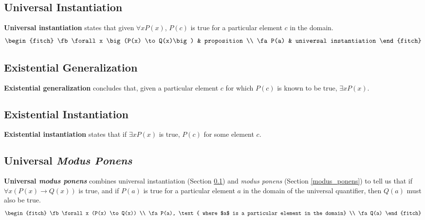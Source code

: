 \subsection{Universal Instantiation}\label{univ_inst}

\textbf{Universal instantiation}  states that given $\forall x P(x)$, $P(c)$ is
true for a particular element $c$ in the domain.
\begin{equation}
  \begin{fitch}
    \fb \forall x \big(P(x) \to Q(x)\big) & proposition \\
    \fa P(a) & universal instantiation
  \end{fitch}
  \label{eq:univ_inst}
\end{equation}

\subsection{Existential Generalization}

\textbf{Existential generalization} concludes
that, given a particular element $c$ for which $P(c)$ is known to be true, $\exists x P(x)$.

\subsection{Existential Instantiation}

\textbf{Existential instantiation} states that if
$\exists x P(x)$ is true, $P(c)$ for some element $c$.

\subsection{Universal \emph{Modus Ponens}}

\textbf{Universal \emph{modus ponens}} combines universal instantiation
(Section \ref{univ_inst}) and \emph{modus ponens} (Section \ref{modus_ponens}) to
tell us that if $\forall x (P(x) \to Q(x) )$ is true, and if $P(a)$ is true for a
particular element $a$ in the domain of the universal quantifier, then $Q(a)$ must
also be true.
\begin{equation}
  \begin{fitch}
    \fb \forall x (P(x) \to Q(x)) \\
    \fa P(a), \text{ where $a$ is a particular element in the domain} \\
    \fa Q(a)
  \end{fitch}
  \label{eq:univ_mod_pon}
\end{equation}

